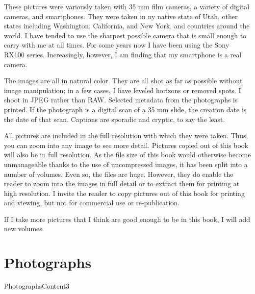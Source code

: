 \documentclass[10pt,letter,oneside]{scrbook}
\begin{document}
	These pictures were variously taken with 35 mm film cameras, a variety of digital cameras, and smartphones. They were taken in ny native state of Utah, other states including Washington, California, and New York, and countries around the world. I have tended to use the sharpest possible camera that is small enough to carry with me at all times. For some years now I have been using the Sony RX100 series. Increasingly, however, I am finding that my smartphone is a real camera.
	
	The images are all in natural color. They are all shot as far as possible without image manipulation; in a few cases, I have leveled horizons or removed spots. I shoot in JPEG rather than RAW. Selected metadata from the photographs is printed. If the photograph is a digital scan of a 35 mm slide, the creation date is the date of that scan. Captions are sporadic and cryptic, to say the least.
	
	All pictures are included in the full resolution with which they were taken. Thus, you can zoom into any image to see more detail. Pictures copied out of this book will also be in full resolution. As the file size of this book would otherwise become unmanageable thanks to the use of uncompressed images, it has been split into a number of volumes. Even so, the files are huge. However, they do enable the reader to zoom into the images in full detail or to extract them for printing at high resolution. I invite the reader to copy pictures out of this book for printing and viewing, but not for commercial use or re-publication. 
	
	If I take more pictures that I think are good enough to be in this book, I will add new volumes.
	
	\chapter{Photographs}
	
	 {PhotographsContent3}
	
\end{document}
